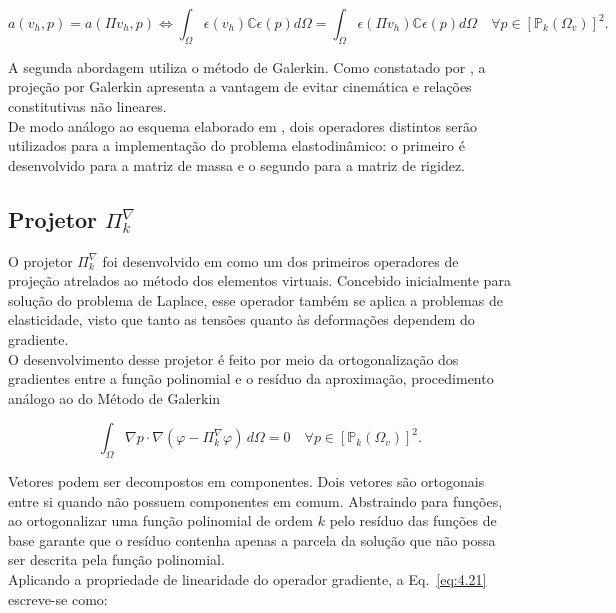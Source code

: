    \begin{equation}
        a(v_h,p) = a(\Pi v_h,p) \Leftrightarrow \int_\Omega \epsilon(v_h)\mathbb{C} \epsilon(p) d\Omega = \int_\Omega \epsilon(\Pi v_h)\mathbb{C} \epsilon(p) d\Omega \quad \forall p \in [\mathbb{P}_k(\Omega_v)]^2.
        \label{eq:4.19}
    \end{equation}

    \indent A segunda abordagem utiliza o método de Galerkin. Como constatado por \citet{wriggers2024virtual}, a projeção por Galerkin apresenta a vantagem de evitar cinemática e relações constitutivas não lineares. \\
    \indent De modo análogo ao esquema elaborado em \citet{arbitraryorder2dvirtualelementspolygonalmeshespartelasticproblem2017a}, dois operadores distintos serão utilizados para a implementação do problema elastodinâmico: o primeiro é desenvolvido para a matriz de massa e o segundo para a matriz de rigidez. 

\subsection{Projetor \texorpdfstring{$\Pi_{k}^{\nabla}$}{Pi k nabla}}
\label{sec:projetor-eliptico}

    \indent O projetor $\Pi_k^\nabla$ foi desenvolvido em \citet{basicprinciplesvirtualelementmethods2013a} como um dos primeiros operadores de projeção atrelados ao método dos elementos virtuais. Concebido inicialmente para solução do problema de Laplace, esse operador também se aplica a problemas de elasticidade, visto que tanto as tensões quanto às deformações dependem do gradiente. \\
    \indent O desenvolvimento desse projetor é feito por meio da ortogonalização dos gradientes entre a função polinomial e o resíduo da aproximação, procedimento análogo ao do Método de Galerkin 
    
    \begin{equation}
        \int_\Omega \nabla p \cdot \nabla (\varphi - \Pi_k^\nabla \varphi) \, d\Omega = 0 \quad \forall p \in [\mathbb{P}_k(\Omega_v)]^2.
        \label{eq:4.20}
    \end{equation}

    \indent Vetores podem ser decompostos em componentes. Dois vetores são ortogonais entre si quando não possuem componentes em comum. Abstraindo para funções, ao ortogonalizar uma função polinomial de ordem $k$ pelo resíduo das funções de base garante que o resíduo contenha apenas a parcela da solução que não possa ser descrita pela função polinomial. \\
    \indent Aplicando a propriedade de linearidade do operador gradiente, a Eq.~\ref{eq:4.21} escreve-se como: 

